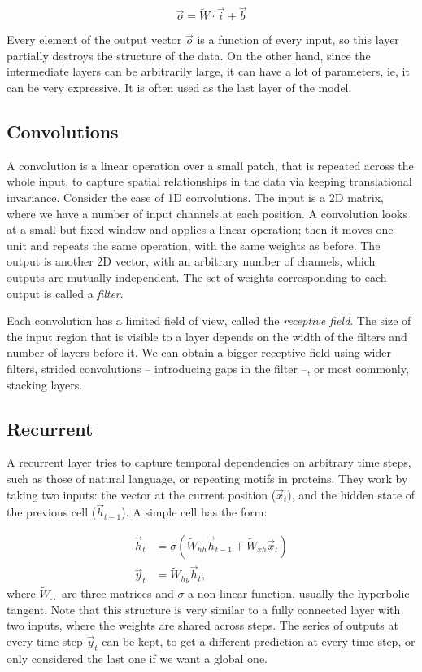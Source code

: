 \begin{equation*}
\vec{o} = \widetilde W \cdot \vec{i} + \vec{b}
\end{equation*}

Every element of the output vector $\vec o$ is a function of every input, so this layer partially destroys the structure of the data.
On the other hand, since the intermediate layers can be arbitrarily large, it can have a lot of parameters, ie, it can be very expressive.
It is often used as the last layer of the model.

\subsection{Convolutions}
A convolution is a linear operation over a small patch, that is repeated across the whole input, to  capture spatial relationships in the data via keeping translational invariance.
Consider the case of 1D convolutions.
The input is a 2D matrix, where we have a number of input channels at each position.
A convolution looks at a small but fixed window and applies a linear operation; then it moves one unit and repeats the same operation, with the same weights as before.
The output is another 2D vector, with an arbitrary number of channels, which outputs are mutually independent.
The set of weights corresponding to each output is called a \emph{filter}.

Each convolution   has a limited field of view, called the \emph{receptive field}.
The size of the input region that is visible to a layer depends on the width of the filters and number of layers before it.
We can obtain a bigger receptive field using wider filters, strided convolutions -- introducing gaps in the filter --, or most commonly, stacking layers.
 

\subsection{Recurrent}
A recurrent layer tries to capture temporal dependencies on arbitrary time steps, such as those of natural language, or repeating motifs in proteins.
They work by taking two inputs: the vector at the current position ($\vec x_t$), and the hidden state of the previous cell ($\vec h_{t-1}$).
A simple cell has the form:

\begin{align*}
\vec h_t &= \sigma\left(\widetilde W_{hh} \vec{h}_{t-1} + \widetilde W_{xh} \vec{x}_{t}\right) \\
\vec y_t &=  \widetilde W_{hy} \vec h_t,
\end{align*}
where $ \widetilde W_{\cdot \cdot}$ are three matrices and $\sigma$ a non-linear function, usually the hyperbolic tangent.
Note that this structure is very similar to a fully connected layer with two inputs, where the weights are shared across steps.
The series of outputs at every time step $\vec y_t$ can be kept, to get a different prediction at every time step, or only considered the last one if we want a global one.

